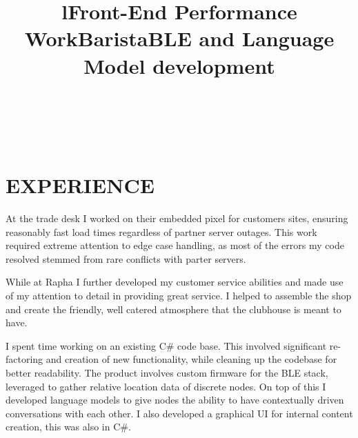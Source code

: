\documentclass[margin]{res}
\begin{document}
\address{ \\180 south 31st street \\Boulder CO}
\address{ \\joerickard.io\\joe.s.rickard@gmail.com }
\begin{resume}
\begin{format}
\title{l}\\
\\
\body
\end{format}
\section{EXPERIENCE}

\title{\textbf{Front-End Performance Work}}
\begin{position}
At the trade desk I worked on their embedded pixel for customers sites, ensuring reasonably fast load times regardless of partner server outages. This work required extreme attention to edge case handling, as most of the errors my code resolved stemmed from rare conflicts with parter servers.
\end{position}

\title{\textbf{Barista}}
\begin{position}
While at Rapha I further developed my customer service abilities and made use of my attention to detail in providing great service. I helped to assemble the shop and create the friendly, well catered atmosphere that the clubhouse is meant to have. 
\end{position}

\title{\textbf{BLE and Language Model development}}
\begin{position}
I spent time working on an existing C\# code base. This involved significant re-factoring and creation of new functionality, while cleaning up the codebase for better readability. The product involves custom firmware for the BLE stack, leveraged to gather relative location data of discrete nodes. On top of this I developed language models to give nodes the ability to have contextually driven conversations with each other. I also developed a graphical UI for internal content creation, this was also in C\#.
\end{position}


\end{resume}
\end{document}
